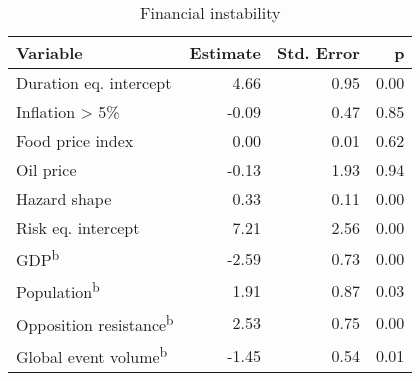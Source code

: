 \begin{table}[ht]
\centering
\caption{Financial instability} 
\label{theme7}
\begin{tabular}{p{3in}rrr}
  \toprule
Variable & Estimate & Std. Error & p \\ 
  \midrule
Duration eq. intercept & 4.66 & 0.95 & 0.00 \\ 
  Inflation > 5\% & -0.09 & 0.47 & 0.85 \\ 
  Food price index & 0.00 & 0.01 & 0.62 \\ 
  Oil price & -0.13 & 1.93 & 0.94 \\ 
  Hazard shape & 0.33 & 0.11 & 0.00 \\ 
  \midrule Risk eq. intercept & 7.21 & 2.56 & 0.00 \\ 
  GDP\textsuperscript{b} & -2.59 & 0.73 & 0.00 \\ 
  Population\textsuperscript{b} & 1.91 & 0.87 & 0.03 \\ 
  Opposition resistance\textsuperscript{b} & 2.53 & 0.75 & 0.00 \\ 
  Global event volume\textsuperscript{b} & -1.45 & 0.54 & 0.01 \\ 
   \bottomrule
\end{tabular}
\end{table}

